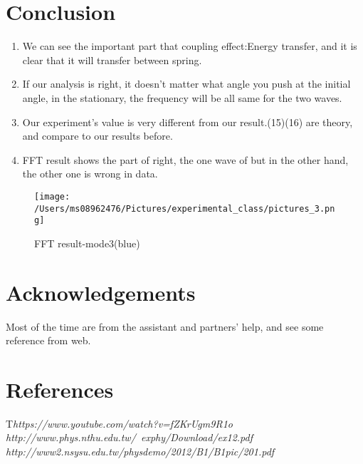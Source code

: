 \documentclass[final,1p,11pt]{elsarticle}
\begin{document}
\section{Conclusion}
\begin{enumerate}
\item We can see the important part that coupling effect:Energy transfer, and it is clear that it will transfer between spring. 
\item If our analysis is right, it doesn't matter what angle you push at the initial angle, in the stationary, the frequency will be all same for the two waves.
\item Our experiment's value is very different from our result.(15)(16) are theory, and compare to our results before.
\item FFT result shows the part of right, the one wave of but in the other hand, the other one is wrong in data.
\end{enumerate} 
\begin{figure}
\caption{FFT result-mode3(blue)}
\centering
\texttt{[image: /Users/ms08962476/Pictures/experimental\_class/pictures\_3.png]}
\end{figure} 

\section*{Acknowledgements}
Most of the time are from the assistant and partners' help, and see some reference from web.
\newpage
\section*{References}


\def\bibname{\Large\bf References}
\def\refname{\Large\bf References}
\pagestyle{plain}

\begin{thebibliography}{9}
T\textit{https://www.youtube.com/watch?v=fZKrUgm9R1o}
\textit{http://www.phys.nthu.edu.tw/~exphy/Download/ex12.pdf}
\textit{http://www2.nsysu.edu.tw/physdemo/2012/B1/B1pic/201.pdf}


\end{thebibliography}
\end{document}
